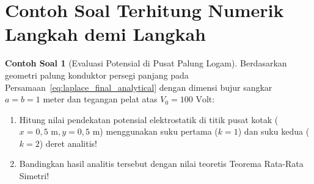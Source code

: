 \documentclass[11pt,a4paper]{article}
\theoremstyle{definition}
\newtheorem{example}{Contoh Soal}[section]
\begin{document}
\section{Contoh Soal Terhitung Numerik Langkah demi Langkah}

\begin{example}[Evaluasi Potensial di Pusat Palung Logam]
Berdasarkan geometri palung konduktor persegi panjang pada Persamaan~\eqref{eq:laplace_final_analytical} dengan dimensi bujur sangkar $a = b = 1\text{ meter}$ dan tegangan pelat atas $V_0 = 100\text{ Volt}$:
\begin{enumerate}[leftmargin=*]
    \item Hitung nilai pendekatan potensial elektrostatik di titik pusat kotak ($x = 0{,}5\text{ m}, y = 0{,}5\text{ m}$) menggunakan suku pertama ($k=1$) dan suku kedua ($k=2$) deret analitis!
    \item Bandingkan hasil analitis tersebut dengan nilai teoretis Teorema Rata-Rata Simetri!
\end{enumerate}
\end{example}
\end{document}
